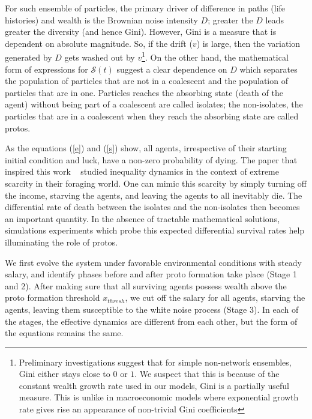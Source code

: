 For such ensemble of particles, the primary driver of difference in paths (life histories) and wealth is the Brownian noise intensity $D$; greater the $D$ leads greater the diversity (and hence Gini). However, Gini is a measure that is dependent on absolute magnitude. So, if the drift ($v$) is large, then the variation generated by
$D$ gets washed out by $v$\footnote{Preliminary investigations suggest that for simple non-network ensembles, Gini either stays close to $0$ or $1$. We suspect that this is because of the constant wealth growth rate used in our models, Gini is a partially useful measure. This is unlike in macroeconomic models where exponential growth rate gives rise an appearance of non-trivial Gini coefficients}.  On the other hand, the mathematical form of expressions for $\mathcal{S}(t)$ suggest a clear dependence on $D$ which separates the population of particles that are not in a coalescent and the population of particles that are in one. Particles reaches the absorbing state (death of the agent) without being part of a coalescent are called isolates; the non-isolates, the particles that are in a coalescent when they reach the absorbing state are called protos. 

As the equations (\ref{e}) and (\ref{s}) show, all agents, irrespective of their starting initial condition and luck, have a non-zero probability of dying. The paper that inspired this work ~\cite{srimil} studied inequality dynamics in the context of extreme scarcity in their foraging world. One can mimic this scarcity by simply turning off the income, starving the agents, and leaving the agents to all inevitably die. The differential rate of death between the isolates and the non-isolates then becomes an important quantity. In the absence of tractable mathematical solutions, simulations experiments which probe this expected differential survival rates help illuminating the role of protos. 

We first evolve the system under favorable environmental conditions with steady salary, and identify phases before and after proto formation take place (Stage 1 and 2). After making sure that all surviving agents possess  wealth above the proto formation threshold $x_{thresh}$, we cut off the salary for all agents, starving the agents, leaving them susceptible to the white noise process (Stage 3). In each of the stages, the effective dynamics are different from each other, but the form of the equations remains the same. 

